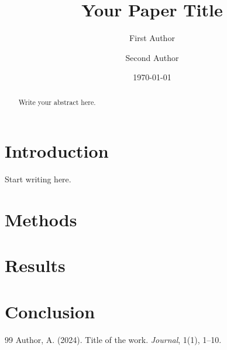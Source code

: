 \documentclass[11pt]{article}
\title{Your Paper Title}
\author{First Author \and Second Author}
\date{\today}
\begin{document}
\maketitle

\begin{abstract}
Write your abstract here.
\end{abstract}

\section{Introduction}
Start writing here.

\section{Methods}

\section{Results}

\section{Conclusion}

\begin{thebibliography}{99}
 Author, A. (2024). Title of the work. \textit{Journal}, 1(1), 1--10.
\end{thebibliography}
\end{document}
